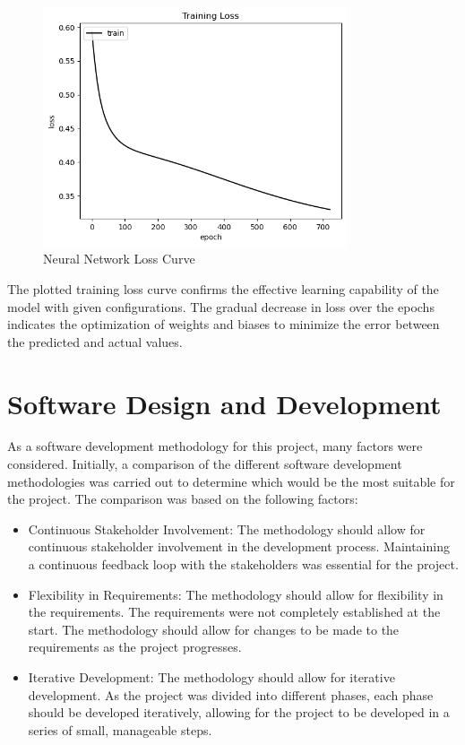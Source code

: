 \begin{figure}[H]
    \centering
    \includegraphics[width=0.8\textwidth]{images/neural_network_loss_curve.png}
    \caption{Neural Network Loss Curve}
    \label{fig:neural_network_loss_curve}
\end{figure}


The plotted training loss curve confirms the effective learning capability of the model with given configurations. The gradual decrease in loss over the epochs indicates the optimization 
of weights and biases to minimize the error between the predicted and actual values.











\section{Software Design and Development}

As a software development methodology for this project, many factors were considered. Initially, a comparison of the different software development methodologies was carried out to determine
which would be the most suitable for the project. The comparison was based on the following factors:

\begin{itemize}
    \item Continuous Stakeholder Involvement: The methodology should allow for continuous stakeholder involvement in the development process. Maintaining a continuous feedback loop with the 
    stakeholders was essential for the project. 
    \item Flexibility in Requirements: The methodology should allow for flexibility in the requirements. The requirements were not completely established at the start. The methodology should allow for changes to be made to the requirements as the project progresses.
    \item Iterative Development: The methodology should allow for iterative development. As the project was divided into different phases, each phase should be developed iteratively, allowing for the project to be developed in a series of small, manageable steps.    
\end{itemize}

